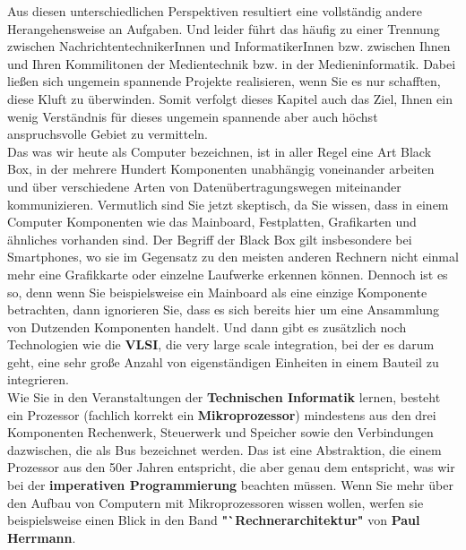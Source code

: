 Aus diesen unterschiedlichen Perspektiven resultiert eine vollständig andere Herangehensweise an Aufgaben. Und leider führt das häufig zu einer Trennung zwischen NachrichtentechnikerInnen und InformatikerInnen bzw. zwischen Ihnen und Ihren Kommilitonen der Medientechnik bzw. in der Medieninformatik. Dabei ließen sich ungemein spannende Projekte realisieren, wenn Sie es nur schafften, diese Kluft zu überwinden. Somit verfolgt dieses Kapitel auch das Ziel, Ihnen ein wenig Verständnis für dieses ungemein spannende aber auch höchst anspruchsvolle Gebiet zu vermitteln.\\

Das was wir heute als Computer bezeichnen, ist in aller Regel eine Art Black Box, in der mehrere Hundert Komponenten unabhängig voneinander arbeiten und über verschiedene Arten von Datenübertragungswegen miteinander kommunizieren. Vermutlich sind Sie jetzt skeptisch, da Sie wissen, dass in einem Computer Komponenten wie das Mainboard, Festplatten, Grafikarten und ähnliches vorhanden sind. Der Begriff der Black Box gilt insbesondere bei Smartphones, wo sie im Gegensatz zu den meisten anderen Rechnern nicht einmal mehr eine Grafikkarte oder einzelne Laufwerke erkennen können. Dennoch ist es so, denn wenn Sie beispielsweise ein Mainboard als eine einzige Komponente betrachten, dann ignorieren Sie, dass es sich bereits hier um eine Ansammlung von Dutzenden Komponenten handelt. Und dann gibt es zusätzlich noch Technologien wie die \textbf{VLSI}, die very large scale integration, bei der es darum geht, eine sehr große Anzahl von eigenständigen Einheiten in einem Bauteil zu integrieren.\\

Wie Sie in den Veranstaltungen der \textbf{Technischen Informatik} lernen, besteht ein Prozessor (fachlich korrekt ein \textbf{Mikroprozessor}) mindestens aus den drei Komponenten Rechenwerk, Steuerwerk und Speicher sowie den Verbindungen dazwischen, die als Bus bezeichnet werden. Das ist eine Abstraktion, die einem Prozessor aus den 50er Jahren entspricht, die aber genau dem entspricht, was wir bei der \textbf{imperativen Programmierung} beachten müssen. Wenn Sie mehr über den Aufbau von Computern mit Mikroprozessoren wissen wollen, werfen sie beispielsweise einen Blick in den Band \textbf{"`Rechnerarchitektur"} von \textbf{Paul Herrmann}.\\


